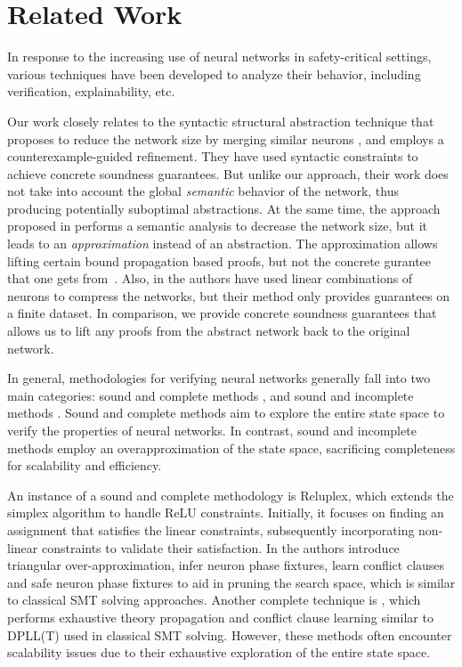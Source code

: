 \section{Related Work}

In response to the increasing use of neural networks in safety-critical settings, 
various techniques have been developed to analyze their behavior, including 
verification, explainability, etc. 

Our work closely relates to the syntactic structural abstraction technique that
proposes to reduce the network size by merging similar
neurons \cite{cegar-nn,cegarette,cleverest-nn}, and employs a
counterexample-guided refinement. They have used
syntactic constraints to achieve concrete soundness guarantees. But unlike our
approach, their work does not take into account the global \textit{semantic}
behavior of the network, thus producing potentially suboptimal abstractions.
At the same time, the approach proposed in \cite{deep-abstract} performs a
semantic analysis to decrease the network size, but it leads to an
\emph{approximation} instead of an abstraction. The approximation allows
lifting certain bound propagation based proofs, but not the concrete gurantee
that one gets from~\cite{cegar-nn}. Also, in \cite{lin-comb-abs-jan} the
authors have used linear combinations of neurons to compress the networks, but
their method only provides guarantees on a finite dataset. In comparison, we
provide concrete soundness guarantees that allows us to lift any proofs from
the abstract network back to the original network.

In general, methodologies for verifying neural networks generally fall into two
main categories: sound and complete methods
\cite{reluplex,formal-ver-piece-wise,comp-reachability-analysis,comp-milp,comp-out-range,comp-max-resilience,marabou,comp-safety-ver-dnn,beta-crown,alpha-crown-bab-fnc,gcp-crown},
and sound and incomplete methods
\cite{deeppoly,crown,incomp-dual-approach,incomp-abs-inp,incomp-robustness-certi,incomp-boost-robustness}.
Sound and complete methods aim to explore the entire state space to verify the
properties of neural networks.
In contrast, sound and incomplete methods employ an overapproximation
of the state space, sacrificing completeness for 
scalability and efficiency.

An instance of a sound and complete methodology is Reluplex, which extends the 
simplex algorithm \cite{simplex} to 
handle ReLU constraints. Initially, it focuses on finding an assignment that 
satisfies the linear constraints, subsequently incorporating non-linear constraints 
to validate their satisfaction. In \cite{formal-ver-piece-wise}
the authors introduce triangular over-approximation, infer neuron phase fixtures,
learn conflict clauses and safe neuron phase fixtures to aid in pruning the search 
space, which is similar to classical SMT solving approaches. Another complete
technique is \neuralsat, which performs exhaustive theory propagation and
conflict clause learning similar to DPLL(T) used in classical SMT solving.
However, these methods often encounter scalability issues due to their
exhaustive exploration of the entire state space. 

